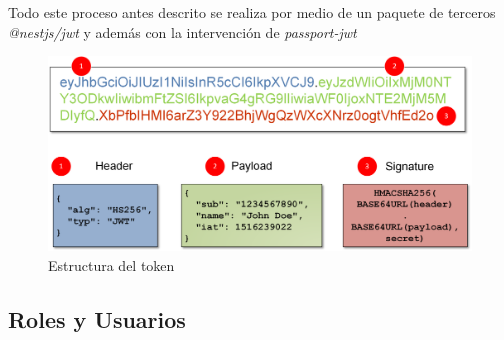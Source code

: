 Todo este proceso antes descrito se realiza por medio de un paquete de terceros \textit{@nestjs/jwt} y además con la intervención de \textit{passport-jwt}

\begin{figure}[h!]
	\centering
	\includegraphics[width=0.95\linewidth]{images/Chapter 2/jwt1}
	\caption{Estructura del token}
	\label{fig:jwt}
\end{figure}

\subsection{Roles y Usuarios}







